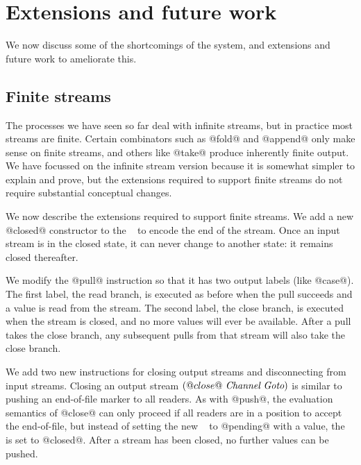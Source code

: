 \section{Extensions and future work}
\label{s:FutureWork}

We now discuss some of the shortcomings of the system, and extensions and future work to ameliorate this.

\subsection{Finite streams}
\label{s:Finite}

The processes we have seen so far deal with infinite streams, but in practice most streams are finite.
Certain combinators such as @fold@ and @append@ only make sense on finite streams, and others like @take@ produce inherently finite output.
We have focussed on the infinite stream version because it is somewhat simpler to explain and prove, but the extensions required to support finite streams do not require substantial conceptual changes.

We now describe the extensions required to support finite streams.
We add a new @closed@ constructor to the \InputState~ to encode the end of the stream.
Once an input stream is in the closed state, it can never change to another state: it remains closed thereafter.

We modify the @pull@ instruction so that it has two output labels (like @case@).
The first label, the read branch, is executed as before when the pull succeeds and a value is read from the stream.
The second label, the close branch, is executed when the stream is closed, and no more values will ever be available.
After a pull takes the close branch, any subsequent pulls from that stream will also take the close branch.

We add two new instructions for closing output streams and disconnecting from input streams.
Closing an output stream $(@close@~\textit{Channel}~\textit{Goto})$ is similar to pushing an end-of-file marker to all readers.
As with @push@, the evaluation semantics of @close@ can only proceed if all readers are in a position to accept the end-of-file, but instead of setting the new \InputState~ to @pending@ with a value, the \InputState~ is set to @closed@.
After a stream has been closed, no further values can be pushed.

